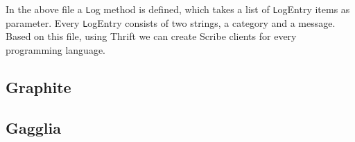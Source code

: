 
In the above file a \texttt Log method is defined, which takes a list of \texttt
LogEntry items as parameter. Every \texttt LogEntry consists of two strings, a
category and a message. Based on this file, using Thrift we can create Scribe
clients for every programming language.
\subsection{Graphite}
\subsection{Gagglia}
